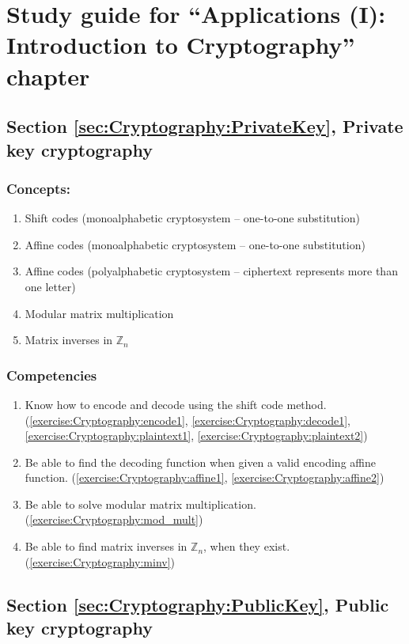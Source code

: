 \section{Study guide  for ``Applications (I): Introduction to Cryptography''  chapter}
\label{sec:Cryptography:StudyGuide} 

\subsection*{Section \ref{sec:Cryptography:PrivateKey}, Private key cryptography}
\subsubsection*{Concepts:}
\begin{enumerate}
\item 
Shift codes (monoalphabetic cryptosystem -- one-to-one substitution)
\item
Affine codes (monoalphabetic cryptosystem -- one-to-one substitution)
\item
Affine codes (polyalphabetic cryptosystem -- ciphertext represents more than one letter)
\item
Modular matrix multiplication
\item
Matrix inverses in ${\mathbb Z}_{n}$
\end{enumerate}

\subsubsection*{Competencies}
\begin{enumerate}
\item
Know how to encode and decode using the shift code method.   (\ref{exercise:Cryptography:encode1}, \ref{exercise:Cryptography:decode1}, \ref{exercise:Cryptography:plaintext1}, \ref{exercise:Cryptography:plaintext2})
\item
Be able to find the decoding function when given a valid encoding affine function.  (\ref{exercise:Cryptography:affine1}, \ref{exercise:Cryptography:affine2})
\item
Be able to solve modular matrix multiplication.  (\ref{exercise:Cryptography:mod_mult})
\item
Be able to find matrix inverses in ${\mathbb Z}_{n}$, when they exist.  (\ref{exercise:Cryptography:minv})
\end{enumerate}


\subsection*{Section \ref{sec:Cryptography:PublicKey}, Public key cryptography}
